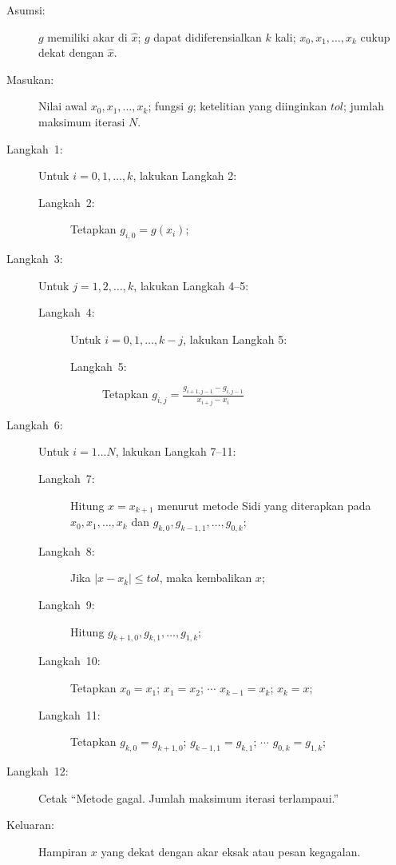 \noindent\begin{pseudocode} 
\begin{description}
\item [{Asumsi:}] $g$ memiliki akar di $\hat{x}$; $g$ dapat didiferensialkan
$k$ kali; $x_{0},x_{1},\ldots,x_{k}$ cukup dekat dengan $\hat{x}$.
\item [{Masukan:}] Nilai awal $x_{0},x_{1},\ldots,x_{k}$; fungsi $g$;
ketelitian yang diinginkan $tol$; jumlah maksimum iterasi $N$.
\item [{Langkah~1:}] Untuk $i=0,1,\ldots,k$, lakukan Langkah 2:

\begin{description}
\item [{Langkah~2:}] Tetapkan $g_{i,0}=g(x_{i})$;
\end{description}
\item [{Langkah~3:}] Untuk $j=1,2,\ldots,k$, lakukan Langkah 4--5:

\begin{description}
\item [{Langkah~4:}] Untuk $i=0,1,\ldots,k-j$, lakukan Langkah 5:

\begin{description}
\item [{Langkah~5:}] Tetapkan ${\displaystyle g_{i,j}=\frac{g_{i+1,j-1}-g_{i,j-1}}{x_{i+j}-x_{i}}}$
\end{description}
\end{description}
\item [{Langkah~6:}] Untuk $i=1\ldots N$, lakukan Langkah 7--11:

\begin{description}
\item [{Langkah~7:}] Hitung $x=x_{k+1}$ menurut metode Sidi yang diterapkan
pada \\
$x_{0},x_{1},\ldots,x_{k}$ dan $g_{k,0},g_{k-1,1},\ldots,g_{0,k}$;
\item [{Langkah~8:}] Jika $|x-x_{k}|\leq tol$, maka kembalikan $x$;
\item [{Langkah~9:}] Hitung $g_{k+1,0},g_{k,1},\ldots,g_{1,k}$;
\item [{Langkah~10:}] Tetapkan $x_{0}=x_{1}$; $x_{1}=x_{2}$; $\cdots$
$x_{k-1}=x_{k}$; $x_{k}=x$;
\item [{Langkah~11:}] Tetapkan $g_{k,0}=g_{k+1,0}$; $g_{k-1,1}=g_{k,1}$;
$\cdots$ $g_{0,k}=g_{1,k}$;
\end{description}
\item [{Langkah~12:}] Cetak ``Metode gagal. Jumlah maksimum iterasi terlampaui.''
\item [{Keluaran:}] Hampiran $x$ yang dekat dengan akar eksak atau pesan
kegagalan.
\end{description}
\end{pseudocode} 

